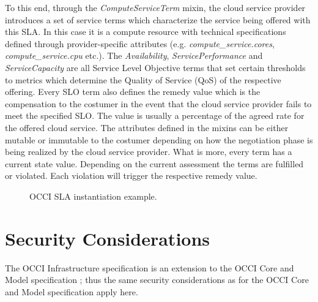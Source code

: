 \documentclass[10pt,a4paper]{article}
\begin{document}
To this end, through the \textit{ComputeServiceTerm} mixin, the cloud service provider introduces a set of service terms which characterize the service being offered with this SLA. In this case it is a compute resource with technical specifications defined through provider-specific attributes (e.g. \textit{compute\_service.cores}, \textit{compute\_service.cpu} etc.). The \textit{Availability}, \textit{ServicePerformance} and \textit{ServiceCapacity} are all Service Level Objective terms that set certain thresholds to metrics which determine the Quality of Service (QoS) of the respective offering. Every SLO term also defines the remedy value which is the compensation to the costumer in the event that the cloud service provider fails to meet the specified SLO. The value is usually a percentage of the agreed rate for the offered cloud service. The attributes defined in the mixins can be either mutable or immutable to the costumer depending on how the negotiation phase is being realized by the cloud service provider. What is more, every term has a current state value. Depending on the current assessment the terms are fulfilled or violated. Each violation will trigger the respective remedy value. 

\begin{figure}[!h]
	{\centering {} \par}
	\caption{OCCI SLA instantiation example.}
	\label{fig:occi-slas-example}
\end{figure}




\section{Security Considerations}
The OCCI Infrastructure specification is an extension to the OCCI Core
and Model specification \cite{occi:core}; thus the same security
considerations as for the OCCI Core and Model specification apply
here.
\end{document}
